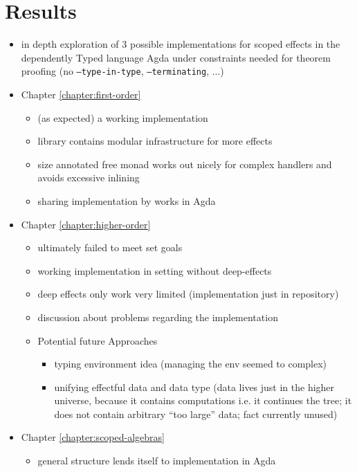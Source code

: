 \documentclass[10pt,a4paper,twoside]{report}
\begin{document}
\section{Results}
\begin{itemize}
\item in depth exploration of 3 possible implementations for scoped effects in
  the dependently Typed language Agda under constraints needed for theorem
  proofing (no \texttt{--type-in-type}, \texttt{--terminating}, ...)
\item Chapter \ref{chapter:first-order}
  \begin{itemize}
    \item (as expected) a working implementation
    \item library contains modular infrastructure for more effects
    \item size annotated free monad works out nicely for complex handlers and
      avoids excessive inlining
    \item sharing implementation by \textcite{bunkenburg2019modeling} works in Agda
  \end{itemize}
\item Chapter \ref{chapter:higher-order}
  \begin{itemize}
    \item ultimately failed to meet set goals
    \item working implementation in setting without deep-effects
    \item deep effects only work very limited (implementation just in repository)
    \item discussion about problems regarding the implementation
    \item Potential future Approaches
    \begin{itemize}
      \item typing environment idea (managing the env seemed to complex)
      \item unifying effectful data and  data type (data
        lives just in the higher universe, because it contains computations i.e.
        it continues the tree; it does not contain arbitrary ``too large'' data;
        fact currently unused)
    \end{itemize}
  \end{itemize}
  \item Chapter \ref{chapter:scoped-algebras}
  \begin{itemize}
    \item general structure lends itself to implementation in Agda

\end{itemize}
\end{itemize}
\end{document}
